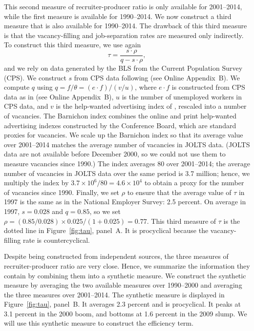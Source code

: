 \documentclass[letterpaper,12pt,leqno]{article}
\newcommand{\pre}[1]{\left( #1 \right)}
\def \t{{\theta}}
\def \r{{\rho}}
\begin{document}
This second measure of recruiter-producer ratio is only available for 2001--2014, while the first measure is available for 1990--2014. We now construct a third measure that is also available for 1990--2014. The drawback of this third measure is that the vacancy-filling and job-separation rates are measured only indirectly. To construct this third measure, we use again
\begin{equation}
\tau= \frac{s\cdot\r}{q-s\cdot \r},
\label{eq:tau3}\end{equation}
and we rely on data generated by the BLS from the Current Population Survey (CPS). We construct $s$ from CPS data  following \citet{S12} (see Online Appendix~B). We compute $q$ using $q=f/\t=\pre{e\cdot f}/\pre{v/u}$, where $e\cdot f$ is constructed from CPS data as in \citet{S12} (see Online Appendix~B), $u$ is the number of unemployed workers in CPS data, and $v$ is the help-wanted advertising index of \citet{B10}, rescaled into a number of vacancies. The Barnichon index combines the online and print help-wanted advertising indexes constructed by the Conference Board, which are standard proxies for vacancies. We scale up the Barnichon index so that its average value over 2001--2014 matches the average number of vacancies in JOLTS data. (JOLTS data are not available before December 2000, so we could not use them to measure vacancies since 1990.) The index averages 80 over 2001--2014; the average number of vacancies in JOLTS data over the same period is 3.7 million; hence, we multiply the index by $3.7\times 10^{6}/80= 4.6\times 10^{4}$ to obtain a proxy for the number of vacancies since 1990. Finally, we set $\r$ to ensure that the average value of $\tau$ in 1997 is the same as in the National Employer Survey: 2.5 percent. On average in 1997, $s=0.028$ and $q=0.85$, so we set $\r=(0.85/0.028)\times 0.025/(1+0.025)=0.77$. This third measure of $\tau$ is the dotted line in Figure~\ref{fig:tau}, panel~A. It is procyclical because the vacancy-filling rate is countercyclical.

Despite being constructed from independent sources, the three measures of recruiter-producer ratio are very close. Hence, we summarize the information they contain by combining them into a synthetic measure.  We construct the synthetic measure by averaging the two available measures over 1990--2000 and averaging the three measures over 2001--2014. The synthetic measure is displayed in Figure~\ref{fig:tau}, panel~B.  It averages 2.3 percent and is procyclical. It peaks at 3.1 percent in the 2000 boom, and bottoms at 1.6 percent in the 2009 slump. We will use this synthetic measure to construct the efficiency term.
\end{document}
